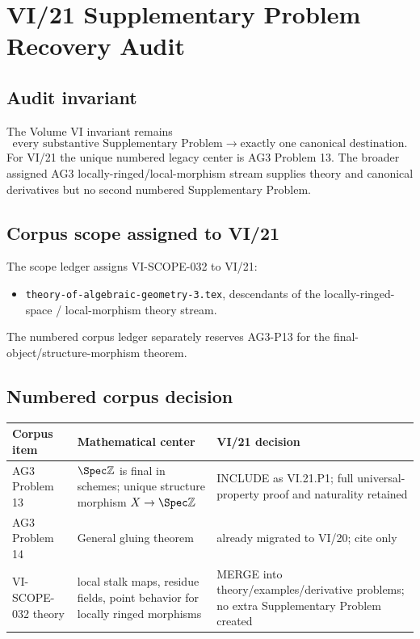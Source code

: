 \chapter*{VI/21 Supplementary Problem Recovery Audit}

\section*{Audit invariant}
The Volume VI invariant remains
\[
\boxed{\text{every substantive Supplementary Problem}\longrightarrow\text{exactly one canonical destination}.}
\]
For VI/21 the unique numbered legacy center is AG3 Problem 13.  The broader assigned AG3
locally-ringed/local-morphism stream supplies theory and canonical derivatives but no second numbered
Supplementary Problem.

\section*{Corpus scope assigned to VI/21}
The scope ledger assigns VI-SCOPE-032 to VI/21:
\begin{itemize}
\item \texttt{theory-of-algebraic-geometry-3.tex}, descendants of the
locally-ringed-space / local-morphism theory stream.
\end{itemize}
The numbered corpus ledger separately reserves AG3-P13 for the final-object/structure-morphism theorem.

\section*{Numbered corpus decision}
\begin{center}
\begin{tabular}{>{\raggedright\arraybackslash}p{}>{\raggedright\arraybackslash}p{}>{\raggedright\arraybackslash}p{}}
\toprule
Corpus item & Mathematical center & VI/21 decision\\
\midrule
AG3 Problem 13 & $\Spec\mathbb Z$ is final in schemes; unique structure morphism $X\to\Spec\mathbb Z$ & INCLUDE as VI.21.P1; full universal-property proof and naturality retained\\
AG3 Problem 14 & General gluing theorem & already migrated to VI/20; cite only\\
VI-SCOPE-032 theory & local stalk maps, residue fields, point behavior for locally ringed morphisms & MERGE into theory/examples/derivative problems; no extra Supplementary Problem created\\
\bottomrule
\end{tabular}
\end{center}

